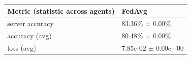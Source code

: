 \begin{tabular}{ll}
\hline
 Metric (statistic across agents)   & FedAvg              \\
\hline
 server accuracy                    & 83.36\% ± 0.00\%      \\
 accuracy (avg)                     & 80.48\% ± 0.00\%      \\
 loss (avg)                         & 7.85e-02 ± 0.00e+00 \\
\hline
\end{tabular}